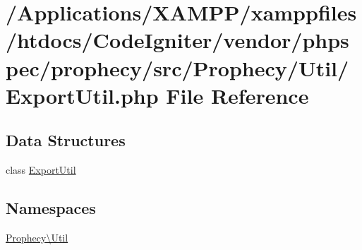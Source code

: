 \hypertarget{_export_util_8php}{}\section{/\+Applications/\+X\+A\+M\+P\+P/xamppfiles/htdocs/\+Code\+Igniter/vendor/phpspec/prophecy/src/\+Prophecy/\+Util/\+Export\+Util.php File Reference}
\label{_export_util_8php}
\subsection*{Data Structures}
\begin{DoxyCompactItemize}
\item 
class \mbox{\hyperlink{class_prophecy_1_1_util_1_1_export_util}{Export\+Util}}
\end{DoxyCompactItemize}
\subsection*{Namespaces}
\begin{DoxyCompactItemize}
\item 
 \mbox{\hyperlink{namespace_prophecy_1_1_util}{Prophecy\textbackslash{}\+Util}}
\end{DoxyCompactItemize}
